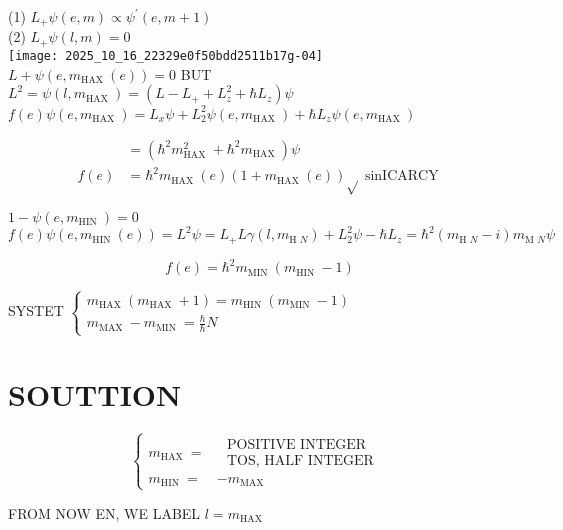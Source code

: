 (1) $L_{+} \psi(e, m) \propto \psi^{\prime}(e, m+1)$\\
(2) $L_{+} \psi(l, m)=0$\\
\texttt{[image: 2025\_10\_16\_22329e0f50bdd2511b17g-04]}\\
$L+\psi\left(e, m_{\text {HAX }}(e)\right)=0$ BUT\\
$L^{2}=\psi\left(l, m_{\text {HAX }}\right)=\left(L-L_{+}+L_{z}^{2}+\hbar L_{z}\right) \psi$\\
$f(e) \psi\left(e, m_{\text {HAX }}\right)=L_{x} \psi+L_{2}^{2} \psi\left(e, m_{\text {HAX }}\right)+\hbar L_{z} \psi\left(e, m_{\text {HAX }}\right)$

$$
\begin{aligned}
& =\left(\hbar^{2} m_{\text {HAX }}^{2}+\hbar^{2} m_{\text {HAX }}\right) \psi \\
f(e) & =\hbar^{2} m_{\text {HAX }}(e)\left(1+m_{\text {HAX }}(e)\right) \sqrt{ } \operatorname{sinICARCY}
\end{aligned}
$$

$1-\psi\left(e, m_{\text {HIN }}\right)=0$\\
$f(e) \psi\left(e, m_{\text {HIN }}(e)\right)=L^{2} \psi=L_{+} L \gamma\left(l, m_{\text {H } N}\right)+L_{2}^{2} \psi-\hbar L_{z}=\hbar^{2}\left(m_{\text {H } N}-i\right) m_{\text {M } N} \psi$

$$
f(e)=\hbar^{2} m_{\text {MIN }}\left(m_{\text {HIN }}-1\right)
$$

SYSTET $\left\{\begin{array}{l}m_{\text {HAX }}\left(m_{\text {HAX }}+1\right)=m_{\text {HIN }}\left(m_{\text {MIN }}-1\right) \\ m_{\text {MAX }}-m_{\text {MIN }}=\frac{\hbar}{\hbar} N\end{array}\right.$

\section*{SOUTTION}
$$
\left\{\begin{aligned}
m_{\text {HAX }}= & \begin{array}{r}
\text { POSITIVE INTEGER } \\
\text { TOS, HALF INTEGER }
\end{array} \\
m_{\text {HIN }}= & -m_{\text {MAX }}
\end{aligned}\right.
$$

FROM NOW EN, WE LABEL $l=m_{\text {HAX }}$

